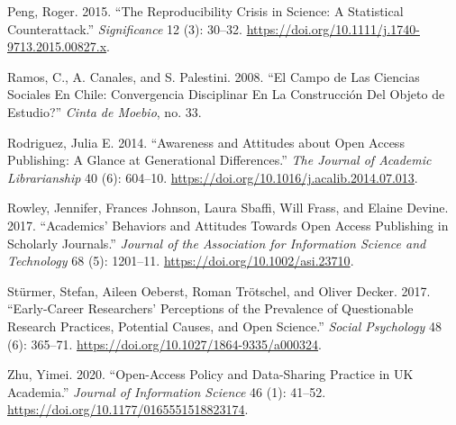 \documentclass[
  letterpaper,
]{article}
\newlength{\cslhangindent}
\newenvironment{CSLReferences}[2] %
 {\begin{list}{}{%
  \setlength{\itemindent}{0pt}
  \setlength{\leftmargin}{0pt}
  \setlength{\parsep}{0pt}
  \ifodd #1
   \setlength{\leftmargin}{\cslhangindent}
   \setlength{\itemindent}{-1\cslhangindent}
  \fi
  \setlength{\itemsep}{#2\baselineskip}}}
 {\end{list}}
\begin{document}
\begin{CSLReferences}{1}{0}
Peng, Roger. 2015. {``The Reproducibility Crisis in Science: {A}
Statistical Counterattack.''} \emph{Significance} 12 (3): 30--32.
\url{https://doi.org/10.1111/j.1740-9713.2015.00827.x}.

Ramos, C., A. Canales, and S. Palestini. 2008. {``El {Campo} de Las
{Ciencias Sociales} En {Chile}: {\textquestiondown}{Convergencia}
Disciplinar En La Construcci{ó}n Del Objeto de Estudio?''} \emph{Cinta
de Moebio}, no. 33.

Rodriguez, Julia E. 2014. {``Awareness and {Attitudes} about {Open
Access Publishing}: {A Glance} at {Generational Differences}.''}
\emph{The Journal of Academic Librarianship} 40 (6): 604--10.
\url{https://doi.org/10.1016/j.acalib.2014.07.013}.

Rowley, Jennifer, Frances Johnson, Laura Sbaffi, Will Frass, and Elaine
Devine. 2017. {``Academics' Behaviors and Attitudes Towards Open Access
Publishing in Scholarly Journals.''} \emph{Journal of the Association
for Information Science and Technology} 68 (5): 1201--11.
\url{https://doi.org/10.1002/asi.23710}.

Stürmer, Stefan, Aileen Oeberst, Roman Trötschel, and Oliver Decker.
2017. {``Early-{Career Researchers}' {Perceptions} of the {Prevalence}
of {Questionable Research Practices}, {Potential Causes}, and {Open
Science}.''} \emph{Social Psychology} 48 (6): 365--71.
\url{https://doi.org/10.1027/1864-9335/a000324}.

Zhu, Yimei. 2020. {``Open-Access Policy and Data-Sharing Practice in
{UK} Academia.''} \emph{Journal of Information Science} 46 (1): 41--52.
\url{https://doi.org/10.1177/0165551518823174}.

\end{CSLReferences}
\end{document}
